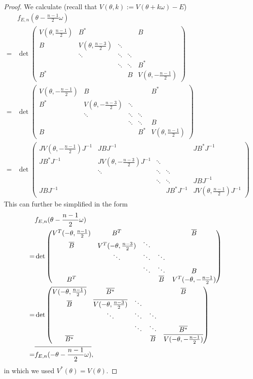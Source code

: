 \documentclass[11pt]{amsart}
\begin{document}
\begin{proof}
We calculate (recall that $V(\theta,k):=V(\theta+k\omega)-E$)
\begin{align}
&f_{E,n}(\theta-\frac{n-1}{2}\omega)\\
=&
\det\left(\begin{matrix}
V(\theta,\frac{n-1}{2}) & B^* & &  &B\\
B &V(\theta,\frac{n-3}{2}) &\ddots \\
& \ddots &\ddots &\ddots \\
& &\ddots &\ddots &B^*\\
B^* & & &B &V(\theta,-\frac{n-1}{2})
\end{matrix}\right)\\
=&
\det\left(\begin{matrix}
V(\theta,-\frac{n-1}{2}) & B & &  &B^*\\
B^* &V(\theta,-\frac{n-3}{2}) &\ddots \\
& \ddots &\ddots &\ddots \\
& &\ddots &\ddots &B\\
B & & &B^* &V(\theta,\frac{n-1}{2})
\end{matrix}\right)\\
=&
\det\left(\begin{matrix}
JV(\theta,-\frac{n-1}{2})J^{-1} & JBJ^{-1} & &  &JB^*J^{-1}\\
JB^*J^{-1} &JV(\theta,-\frac{n-3}{2})J^{-1} &\ddots \\
& \ddots &\ddots &\ddots \\
& &\ddots &\ddots &JBJ^{-1}\\
JBJ^{-1} & & &JB^*J^{-1} &JV(\theta,\frac{n-1}{2})J^{-1}
\end{matrix}\right)
\end{align}
This can further be simplified in the form
\begin{align}\notag
&f_{E,n}(\theta-\frac{n-1}{2}\omega)\\
=&
\det\left(\begin{matrix}
V^T(-\theta,\frac{n-1}{2}) & B^T & &  &\overline{B}\\
\overline{B} &V^T(-\theta,\frac{n-3}{2}) &\ddots \\
& \ddots &\ddots &\ddots \\
& &\ddots &\ddots &B\\
B^T & & &\overline{B} &V^T(-\theta,-\frac{n-1}{2})
\end{matrix}\right)\\
=&
\det\left(\begin{matrix}
\overline{V(-\theta,\frac{n-1}{2})} & \overline{B^*} & &  &\overline{B}\\
\overline{B} &\overline{V(-\theta,\frac{n-3}{2})} &\ddots \\
& \ddots &\ddots &\ddots \\
& &\ddots &\ddots &\overline{B^*}\\
\overline{B^*} & & &\overline{B} &\overline{V(-\theta,-\frac{n-1}{2})}
\end{matrix}\right)\\
=&\overline{f_{E,n}(-\theta-\frac{n-1}{2}\omega)},
\end{align}
in which we used $V^*(\theta)=V(\theta)$.
\end{proof}
\end{document}
